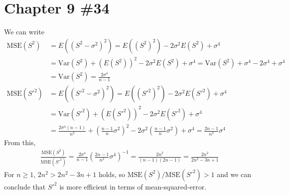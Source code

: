 \documentclass{scrartcl}
\begin{document}
\section{Chapter 9 \#34}
We can write
\begin{align*}
  \mathrm{MSE}(S^2)
  &= E((S^2 - \sigma^2)^2)
  = E((S^2)^2) - 2\sigma^2 E(S^2) + \sigma^4 \\
  &= \mathrm{Var}(S^2) + (E(S^2))^2 - 2\sigma^2 E(S^2) + \sigma^4
  = \mathrm{Var}(S^2) + \sigma^4 - 2\sigma^4 + \sigma^4 \\
  &= \mathrm{Var}(S^2)
  = \frac{2\sigma^4}{n - 1} \\
  \mathrm{MSE}(S'^2)
  &= E((S'^2 - \sigma^2)^2)
  = E((S'^2)^2) - 2\sigma^2 E(S'^2) + \sigma^4 \\
  &= \mathrm{Var}(S'^2) + (E(S'^2))^2 - 2\sigma^2 E(S'^2) + \sigma^4 \\
  &= \frac{2\sigma^4 (n - 1)}{n^2} + \left( \frac{n - 1}{n} \sigma^2 \right)^2
    - 2\sigma^2 \left( \frac{n - 1}{n} \sigma^2 \right) + \sigma^4
  = \frac{2n - 1}{n^2} \sigma^4
\end{align*}
From this,
\begin{align*}
  \frac{\mathrm{MSE}(S^2)}{\mathrm{MSE}(S'^2)}
  = \frac{2\sigma^4}{n - 1} \left( \frac{2n - 1}{n^2} \sigma^4 \right)^{-1}
  = \frac{2n^2}{(n - 1)(2n - 1)}
  = \frac{2n^2}{2n^2 - 3n + 1}
\end{align*}
For \(n \ge 1\), \(2n^2 > 2n^2 - 3n + 1\) holds, so \(\mathrm{MSE}(S^2) /
\mathrm{MSE}(S'^2) > 1\) and we can conclude that \(S'^2\) is more efficient in
terms of mean-squared-error.
\end{document}
